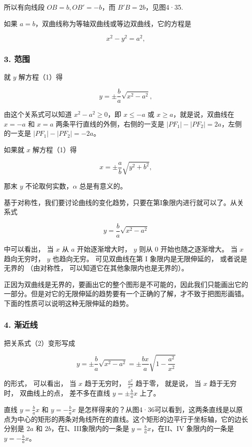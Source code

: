 所以有向线段 \(OB = b, OB' = -b\)，而 \(B'B = 2b\)，见图4·35.

如果 \(a = b\)，双曲线称为等轴双曲线或等边双曲线，它的方程是

\[
x^{2} - y^{2} = a^{2},
\]

\subsubsection{3. 范围}\label{ux8303ux56f4-2}

就 \(y\) 解方程（1）得

\[
y = \pm \frac {b}{a} \sqrt {x^{2} - a^{2}}, \tag {2}
\]

由这个关系式可以知道 \(x^{2} - a^{2} \geqslant 0\)，即
\(x \leqslant -a\) 或 \(x \geqslant a\)，就是说，双曲线在 \(x = -a\) 和
\(x = a\) 两条平行直线的外侧，右侧的一支是
\(|PF_{1}| - |PF_{2}| = 2a\)，左侧的一支是
\(|PF_{1}| - |PF_{2}| = -2a\)。

如果就 \(x\) 解方程（1）得

\[
x = \pm \frac {a}{b} \sqrt {y^{2} + b^{2}}, \tag {3}
\]

那末 \(y\) 不论取何实数，\(\alpha\) 总是有意义的。

基于对称性，我们要讨论曲线的变化趋势，只要在第I象限内进行就可以了。从关系式

\[
y = \frac {b}{a} \sqrt {x^{2} - a^{2}}
\]

中可以看出， 当 \(x\) 从 \(a\) 开始逐渐增大时， \(y\) 则从 \(0\)
开始也随之逐渐增大。 当 \(x\) 趋向无穷时， \(y\) 也趋向无穷。
可见双曲线在第 I 象限内是无限伸延的， 或者说是无界的 （由对称性，
可以知道它在其他象限内也是无界的）。

正因为双曲线是无界的，要画出它的整个图形是不可能的，因此我们只能画出它的一部分。但是对它的无限伸延的趋势要有一个正确的了解，才不致于把图形画错。下面的性质可以说明这种无限伸延的趋势。

\subsubsection{4. 渐近线}\label{ux6e10ux8fd1ux7ebf}

把关系式（2）变形写成

\[
y = \pm \frac {b}{a} \sqrt {x^{2} - a^{2}} = \pm \frac {b x}{a} \sqrt {1 - \frac {a^{2}}{x^{2}}}
\]

的形式， 可以看出， 当 \(x\) 趋于无穷时， \(\frac{a^2}{x^2}\) 趋于零，
就是说， 当 \(x\) 趋于无穷时， 双曲线上的点， 差不多在直线
\(y = \pm \frac{b}{a} x\) 上了。

直线 \(y = \frac{b}{a} x\) 和 \(y = -\frac{b}{a} x\)
是怎样得来的？从图4·36可以看到，这两条直线是以原点为中心的矩形的两条对角线所在的直线。这个矩形的边平行于坐标轴，它的边长分别是
\(2a\) 和 \(2b\)，在I、III象限内的一条是 \(y = \frac{b}{a} x\)，在II、IV
象限内的一条是 \(y = -\frac{b}{a} x\)。

